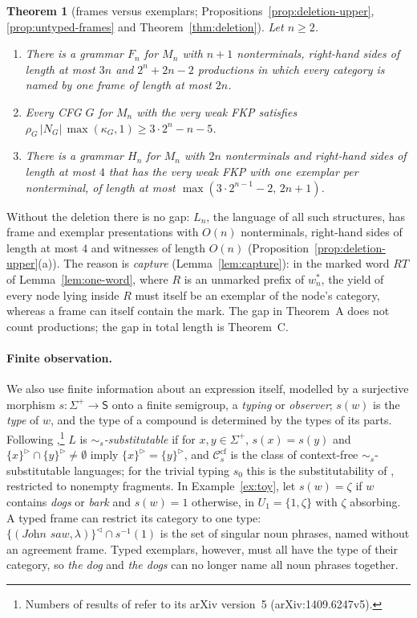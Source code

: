 \documentclass[11pt]{article}
\numberwithin{equation}{section}
\theoremstyle{plain}
\theoremstyle{definition}
\theoremstyle{remark}
\theoremstyle{plain}
\newtheorem{mainthm}{Theorem}
\newcommand{\eps}{\lambda}
\newcommand{\R}{^{\rhd}}
\newcommand{\Lc}{^{\lhd}}
\newcommand{\Ccf}[1]{\mathcal C^{\mathrm{cf}}_{#1}}
\begin{document}
\begin{mainthm}[frames versus exemplars; Propositions~\ref{prop:deletion-upper}, \ref{prop:untyped-frames} and Theorem~\ref{thm:deletion}]
Let $n\ge2$.
\begin{enumerate}[label=\textup{(\roman*)},nosep]
\item There is a grammar $F_n$ for $M_n$ with $n+1$ nonterminals,
right-hand sides of length at most $3n$ and $2^n+2n-2$ productions in which
every category is named by one frame of length at most $2n$.
\item Every CFG $G$ for $M_n$ with the very weak FKP satisfies
$\rho_G\,|N_G|\,\max(\kappa_G,1)\ge3\cdot2^n-n-5$.
\item There is a grammar $H_n$ for $M_n$ with $2n$ nonterminals and
right-hand sides of length at most $4$ that has the very weak FKP with one
exemplar per nonterminal, of length at most $\max(3\cdot2^{n-1}-2,\,2n+1)$.
\end{enumerate}
\end{mainthm}

Without the deletion there is no gap: $L_n$, the language of all such
structures, has frame and exemplar presentations with $O(n)$ nonterminals,
right-hand sides of length at most $4$ and witnesses of length $O(n)$
(Proposition~\ref{prop:deletion-upper}(a)).  The
reason is \emph{capture} (Lemma~\ref{lem:capture}): in the marked word $RT$
of Lemma~\ref{lem:one-word}, where $R$ is an unmarked prefix of $w^*_n$, the
yield of every node lying inside $R$ must itself be an exemplar of the node's
category, whereas a frame can itself contain the mark.  The gap in Theorem~A does not count productions; the gap in total length
is Theorem~C.

\paragraph{Finite observation.}
We also use finite information about an expression itself, modelled by a
surjective morphism $s:\Sigma^+\to\mathsf S$ onto a finite semigroup, a
\emph{typing} or \emph{observer}; $s(w)$ is the \emph{type} of $w$, and the
type of a compound is determined by the types of its parts.  Following
\citet[Def.~2.1]{kuriyama-tcs1},\footnote{Numbers of results of
\citet{kuriyama-tcs1} refer to its arXiv version~5 (arXiv:1409.6247v5).}
$L$ is \emph{$\sim_s$-substitutable} if for $x,y\in\Sigma^+$, $s(x)=s(y)$ and
$\{x\}\R\cap\{y\}\R\ne\emptyset$ imply $\{x\}\R=\{y\}\R$, and $\Ccf s$ is the
class of context-free $\sim_s$-substitutable languages; for the trivial
typing $s_0$ this is the substitutability of \citet{clark-eyraud2007},
restricted to nonempty fragments.  In Example~\ref{ex:toy}, let
$s(w)=\zeta$ if $w$ contains \emph{dogs} or \emph{bark} and $s(w)=1$
otherwise, in $U_1=\{1,\zeta\}$ with $\zeta$ absorbing.  A typed frame can
restrict its category to one type: $\{(\textit{John saw},\eps)\}\Lc\cap
s^{-1}(1)$ is the set of singular noun phrases, named without an agreement
frame.  Typed exemplars, however, must all have the type of their
category, so \emph{the dog} and \emph{the dogs} can no longer name all noun
phrases together.
\end{document}
